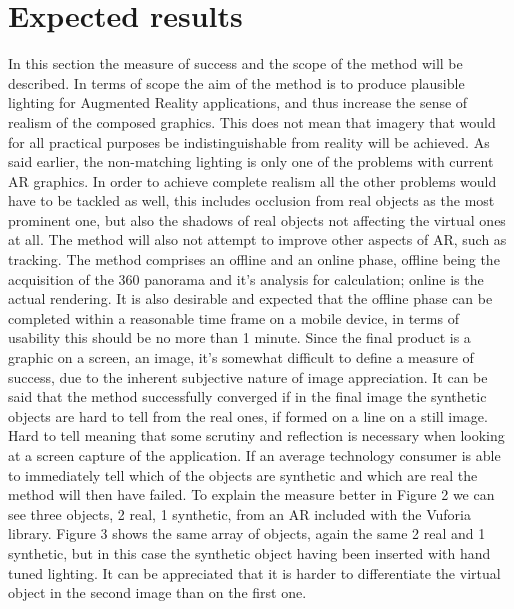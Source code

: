 \documentclass{article}
\begin{document}
\section{Expected results}
In this section the measure of success and the scope of the method will be described. In terms of scope the aim of the method is to produce plausible lighting for Augmented Reality applications, and thus increase the sense of realism of the composed graphics. This does not mean that imagery that would for all practical purposes be indistinguishable from reality will be achieved. As said earlier, the non-matching lighting is only one of the problems with current AR graphics. In order to achieve complete realism all the other problems would have to be tackled as well, this includes occlusion from real objects as the most prominent one, but also the shadows of real objects not affecting the virtual ones at all. The method will also not attempt to improve other aspects of AR, such as tracking. The method comprises an offline and an online phase, offline being the acquisition of the 360 panorama and it's analysis for calculation; online is the actual rendering. It is also desirable and expected that the offline phase can be completed within a reasonable time frame on a mobile device, in terms of usability this should be no more than 1 minute.\newline
Since the final product is a graphic on a screen, an image, it's somewhat difficult to define a measure of success, due to the inherent subjective nature of image appreciation. It can be said that the method successfully converged if in the final image the synthetic objects are hard to tell from the real ones, if formed on a line on a still image. Hard to tell meaning that some scrutiny and reflection is necessary when looking at a screen capture of the application. If an average technology consumer is able to immediately tell which of the objects are synthetic and which are real the method will then have failed. To explain the measure better in Figure 2 we can see three objects, 2 real, 1 synthetic, from an AR included with the Vuforia library. Figure 3 shows the same array of objects, again the same 2 real and 1 synthetic, but in this case the synthetic object having been inserted with hand tuned lighting. It can be appreciated that it is harder to differentiate the virtual object in the second image than on the first one.
\end{document}
